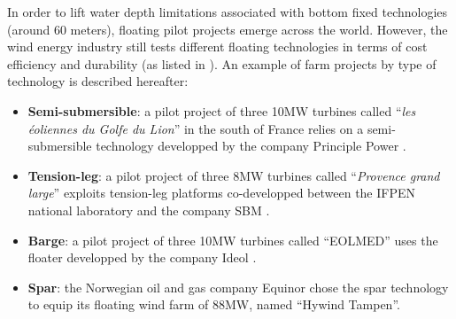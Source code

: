 In order to lift water depth limitations associated with bottom fixed technologies (around 60 meters), floating pilot projects emerge across the world. 
However, the wind energy industry still tests different floating technologies in terms of cost efficiency and durability (as listed in \citet{mackinnon_2022_FOWT_table}). 
An example of farm projects by type of technology is described hereafter: 
\begin{itemize}
    \item \textbf{Semi-submersible}: a pilot project of three 10MW turbines called ``\textit{les éoliennes du Golfe du Lion}'' in the south of France relies on a semi-submersible technology developped by the company Principle Power \citep{cermelli_2018_windfloat}.   
    \item \textbf{Tension-leg}: a pilot project of three 8MW turbines called ``\textit{Provence grand large}'' exploits tension-leg platforms co-developped between the IFPEN national laboratory and the company SBM \citep{caille_2017_TPL_IFPEN}. 
    \item \textbf{Barge}: a pilot project of three 10MW turbines called ``EOLMED'' uses the floater developped by the company Ideol \citep{guignier_2016_ideol}. 
    \item \textbf{Spar}: the Norwegian oil and gas company Equinor chose the spar technology \citep{driscoll_2016_hywind} to equip its floating wind farm of 88MW, named ``Hywind Tampen''. 
\end{itemize}

